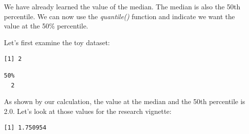 \documentclass[
  11pt,
]{book}
\newenvironment{Shaded}{\begin{snugshade}}{\end{snugshade}}
\newcommand{\AttributeTok}[1]{\textcolor[rgb]{0.77,0.63,0.00}{#1}}
\newcommand{\ConstantTok}[1]{\textcolor[rgb]{0.00,0.00,0.00}{#1}}
\newcommand{\FloatTok}[1]{\textcolor[rgb]{0.00,0.00,0.81}{#1}}
\newcommand{\FunctionTok}[1]{\textcolor[rgb]{0.00,0.00,0.00}{#1}}
\newcommand{\NormalTok}[1]{#1}
\newcommand{\SpecialCharTok}[1]{\textcolor[rgb]{0.00,0.00,0.00}{#1}}
\begin{document}
We have already learned the value of the median. The median is also the 50th percentile. We can now use the \emph{quantile()} function and indicate we want the value at the 50\% percentile.

Let's first examine the toy dataset:

\begin{Shaded}
\end{Shaded}

\begin{verbatim}
[1] 2
\end{verbatim}

\begin{Shaded}
\end{Shaded}

\begin{verbatim}
50% 
  2 
\end{verbatim}

As shown by our calculation, the value at the median and the 50th percentile is 2.0. Let's look at those values for the research vignette:

\begin{Shaded}
\end{Shaded}

\begin{verbatim}
[1] 1.750954
\end{verbatim}

\begin{Shaded}
\end{Shaded}
\end{document}
